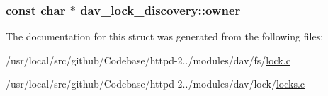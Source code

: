 \subsubsection[{\texorpdfstring{owner}{owner}}]{\setlength{\rightskip}{0pt plus 5cm}const char $\ast$ dav\+\_\+lock\+\_\+discovery\+::owner}\hypertarget{structdav__lock__discovery_a7df51e7814b605278b709bd8c29d4861}{}\label{structdav__lock__discovery_a7df51e7814b605278b709bd8c29d4861}


The documentation for this struct was generated from the following files\+:\begin{DoxyCompactItemize}
\item 
/usr/local/src/github/\+Codebase/httpd-\/2../modules/dav/fs/\hyperlink{lock_8c}{lock.\+c}\item 
/usr/local/src/github/\+Codebase/httpd-\/2../modules/dav/lock/\hyperlink{locks_8c}{locks.\+c}\end{DoxyCompactItemize}
